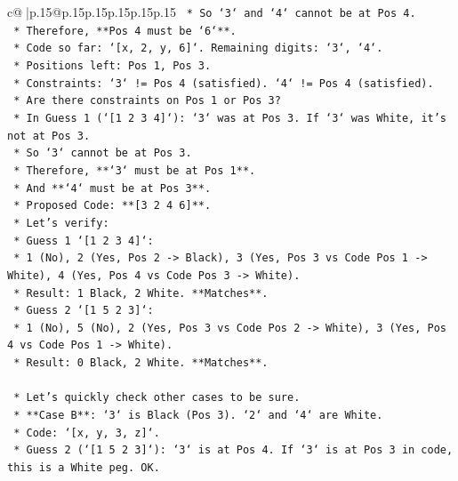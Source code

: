 \documentclass{article}
\begin{document}
{\begin{supertabular}{c@{$\;$}|p{.15\linewidth}@{}p{.15\linewidth}p{.15\linewidth}p{.15\linewidth}p{.15\linewidth}p{.15\linewidth}}
{{{\texttt{            *   So `3` and `4` cannot be at Pos 4.} \\
\texttt{            *   Therefore, **Pos 4 must be `6`**.} \\
\texttt{            *   Code so far: `{[}x, 2, y, 6{]}`. Remaining digits: `3`, `4`.} \\
\texttt{            *   Positions left: Pos 1, Pos 3.} \\
\texttt{            *   Constraints: `3` != Pos 4 (satisfied). `4` != Pos 4 (satisfied).} \\
\texttt{            *   Are there constraints on Pos 1 or Pos 3?} \\
\texttt{            *   In Guess 1 (`{[}1 2 3 4{]}`): `3` was at Pos 3. If `3` was White, it's not at Pos 3.} \\
\texttt{            *   So `3` cannot be at Pos 3.} \\
\texttt{            *   Therefore, **`3` must be at Pos 1**.} \\
\texttt{            *   And **`4` must be at Pos 3**.} \\
\texttt{            *   Proposed Code: **{[}3 2 4 6{]}**.} \\
\texttt{            *   Let's verify:} \\
\texttt{                *   Guess 1 `{[}1 2 3 4{]}`:} \\
\texttt{                    *   1 (No), 2 (Yes, Pos 2 {-}> Black), 3 (Yes, Pos 3 vs Code Pos 1 {-}> White), 4 (Yes, Pos 4 vs Code Pos 3 {-}> White).} \\
\texttt{                    *   Result: 1 Black, 2 White. **Matches**.} \\
\texttt{                *   Guess 2 `{[}1 5 2 3{]}`:} \\
\texttt{                    *   1 (No), 5 (No), 2 (Yes, Pos 3 vs Code Pos 2 {-}> White), 3 (Yes, Pos 4 vs Code Pos 1 {-}> White).} \\
\texttt{                    *   Result: 0 Black, 2 White. **Matches**.} \\
\\ 
\texttt{        *   Let's quickly check other cases to be sure.} \\
\texttt{        *   **Case B**: `3` is Black (Pos 3). `2` and `4` are White.} \\
\texttt{            *   Code: `{[}x, y, 3, z{]}`.} \\
\texttt{            *   Guess 2 (`{[}1 5 2 3{]}`): `3` is at Pos 4. If `3` is at Pos 3 in code, this is a White peg. OK.} \\
}}}
\end{supertabular}}
\end{document}
